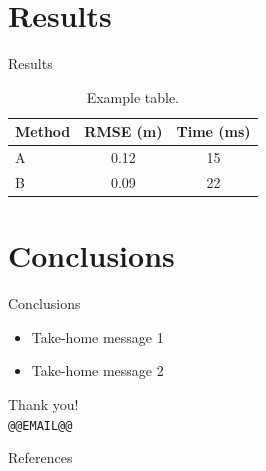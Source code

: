 \documentclass[aspectratio=169,11pt]{beamer}   %
\begin{document}
\section{Results}

\begin{frame}{Results}
  \begin{table}
    \centering
    \begin{tabular}{lcc}
      \toprule
      Method & RMSE (m) & Time (ms) \\
      \midrule
      A & 0.12 & 15 \\
      B & \alert{0.09} & 22 \\
      \bottomrule
    \end{tabular}
    \caption{Example table.}
  \end{table}
\end{frame}

\section{Conclusions}

\begin{frame}{Conclusions}
  \begin{itemize}
    \item Take-home message 1
    \item Take-home message 2
  \end{itemize}
\end{frame}

\begin{frame}[c]
  \centering
  {\Large Thank you!}\\[1em]
  \texttt{@@EMAIL@@}
\end{frame}

\appendix
\begin{frame}[allowframebreaks]{References}
  \footnotesize
  
  
\end{frame}
\end{document}
